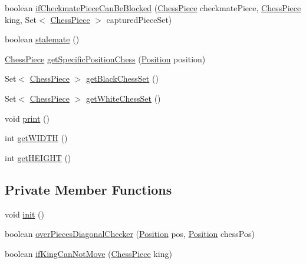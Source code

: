 \begin{DoxyCompactItemize}
\item 
boolean \mbox{\hyperlink{classchess_1_1models_1_1_board_a59a36d62ed2b4ef22b14fda1c10968d8}{if\+Checkmate\+Piece\+Can\+Be\+Blocked}} (\mbox{\hyperlink{classchess_1_1models_1_1_chess_piece}{Chess\+Piece}} checkmate\+Piece, \mbox{\hyperlink{classchess_1_1models_1_1_chess_piece}{Chess\+Piece}} king, Set$<$ \mbox{\hyperlink{classchess_1_1models_1_1_chess_piece}{Chess\+Piece}} $>$ captured\+Piece\+Set)
\item 
boolean \mbox{\hyperlink{classchess_1_1models_1_1_board_aca772c3b56248d6e3fbf97d00a9abaf9}{stalemate}} ()
\item 
\mbox{\hyperlink{classchess_1_1models_1_1_chess_piece}{Chess\+Piece}} \mbox{\hyperlink{classchess_1_1models_1_1_board_a3e21ecd167f3c80dfd260e9acde208c6}{get\+Specific\+Position\+Chess}} (\mbox{\hyperlink{classchess_1_1models_1_1_position}{Position}} position)
\item 
Set$<$ \mbox{\hyperlink{classchess_1_1models_1_1_chess_piece}{Chess\+Piece}} $>$ \mbox{\hyperlink{classchess_1_1models_1_1_board_a4dcc35426fd6ebe9725b2edaa4752310}{get\+Black\+Chess\+Set}} ()
\item 
Set$<$ \mbox{\hyperlink{classchess_1_1models_1_1_chess_piece}{Chess\+Piece}} $>$ \mbox{\hyperlink{classchess_1_1models_1_1_board_a0fab147b0205caf586306a03e758e7bb}{get\+White\+Chess\+Set}} ()
\item 
void \mbox{\hyperlink{classchess_1_1models_1_1_board_af22da20d051a6cc31c6730e5dc80d81e}{print}} ()
\item 
int \mbox{\hyperlink{classchess_1_1models_1_1_board_aeab935c6befad60e51084a78458ebf39}{get\+W\+I\+D\+TH}} ()
\item 
int \mbox{\hyperlink{classchess_1_1models_1_1_board_a28a3d4b9d0738a26666b7c97394242a9}{get\+H\+E\+I\+G\+HT}} ()
\end{DoxyCompactItemize}
\subsection*{Private Member Functions}
\begin{DoxyCompactItemize}
\item 
void \mbox{\hyperlink{classchess_1_1models_1_1_board_a63ff29b16684420475c594d5dc11f24a}{init}} ()
\item 
boolean \mbox{\hyperlink{classchess_1_1models_1_1_board_ade8f6def7998bb1bd22923e09a8a8c8b}{over\+Pieces\+Diagonal\+Checker}} (\mbox{\hyperlink{classchess_1_1models_1_1_position}{Position}} pos, \mbox{\hyperlink{classchess_1_1models_1_1_position}{Position}} chess\+Pos)
\item 
boolean \mbox{\hyperlink{classchess_1_1models_1_1_board_adde204ed1d3ce6bd7841972c322dac9a}{if\+King\+Can\+Not\+Move}} (\mbox{\hyperlink{classchess_1_1models_1_1_chess_piece}{Chess\+Piece}} king)
\end{DoxyCompactItemize}
